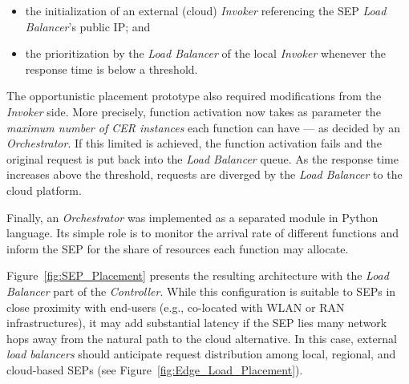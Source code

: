 \begin{itemize}
    \item the initialization of an external (cloud) \textit{Invoker} referencing the SEP \textit{Load Balancer}'s public IP; and
    
    \item the prioritization by the \textit{Load Balancer} of the local \textit{Invoker} whenever the response time is below a threshold. %
\end{itemize}

The opportunistic placement prototype also required modifications from the \textit{Invoker} side. More precisely, function activation now takes as parameter the \textit{maximum number of CER instances} each function can have --- as decided by an \textit{Orchestrator}. If this limited is achieved, the function activation fails and the original request is put back into the \textit{Load Balancer} queue. As the response time increases above the threshold, requests are diverged by the \textit{Load Balancer} to the cloud platform. 

Finally, an \textit{Orchestrator} was implemented as a separated module in Python language. Its simple role is to monitor the arrival rate of different functions and inform the SEP for the share of resources each function may allocate.



Figure~\ref{fig:SEP_Placement} presents the resulting architecture with the \textit{Load Balancer} part of the \textit{Controller}. While this configuration is suitable to SEPs in close proximity with end-users (e.g., co-located with WLAN or RAN infrastructures), it may add substantial latency if the SEP lies many network hops away from the natural path to the cloud alternative. In this case, external \textit{load balancers} should anticipate request distribution among local, regional, and cloud-based SEPs (see Figure~\ref{fig:Edge_Load_Placement}).





